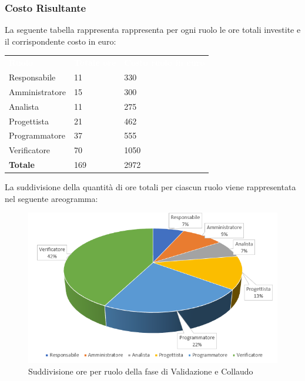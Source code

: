 \subsubsection{Costo Risultante}
La seguente tabella rappresenta rappresenta per ogni ruolo le ore totali investite e il corrispondente costo in euro:
{
	\renewcommand{\arraystretch}{2}
\begin{table}[h!]
	\caption{Tabella del costo risultante di Validazione e Collaudo}
	\begin{longtable}	{ C{3cm} C{2cm} C{4cm}}

		\textcolor{white}{\textbf{Ruolo}} & \textcolor{white}{\textbf{Totale ore}} & \textcolor{white}{\textbf{Costo ruolo in euro}}\\	
        
        Responsabile & 11 & 330\\
        Amministratore & 15 & 300 \\
        Analista & 11 & 275\\
        Progettista & 21 & 462\\
        Programmatore & 37 & 555\\
        Verificatore & 70 & 1050\\
        \textbf{Totale} & 169 & 2972\
	
	\end{longtable}
\end{table}
	
}

La suddivisione della quantità di ore totali per ciascun ruolo viene rappresentata nel seguente areogramma:

\begin{figure}[h]
	\centering
	\caption{Suddivisione ore per ruolo della fase di Validazione e Collaudo}
	\includegraphics[scale=2.5]{sezioni/Aerogrammi/AerogrammaValidazione.png}
\end{figure}


